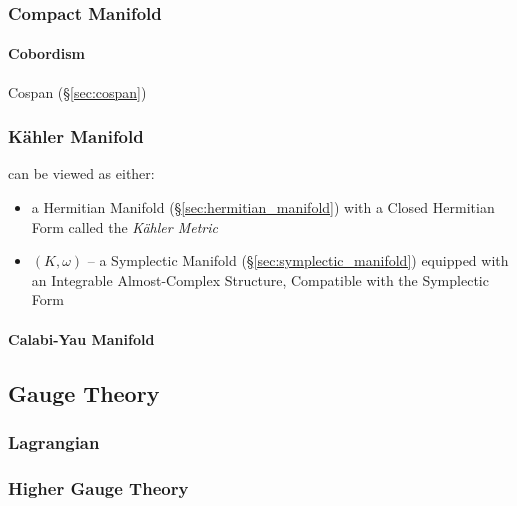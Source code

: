 \subsubsection{Compact Manifold}\label{sec:compact_manifold}

\paragraph{Cobordism}\label{sec:cobordism}\hfill

Cospan (\S\ref{sec:cospan})



\subsubsection{K\"ahler Manifold}\label{sec:kahler_manifold}

can be viewed as either:

\begin{itemize}
\item a Hermitian Manifold (\S\ref{sec:hermitian_manifold}) with a
  Closed Hermitian Form called the \emph{K\"ahler Metric} %
\item $(K,\omega)$ -- a Symplectic Manifold
  (\S\ref{sec:symplectic_manifold}) equipped with an Integrable
  Almost-Complex Structure, Compatible with the Symplectic Form %
\end{itemize}



\paragraph{Calabi-Yau Manifold}\label{sec:calabi_yau_manifold}



\subsection{Gauge Theory}\label{sec:gauge_theory}




\subsubsection{Lagrangian}\label{sec:lagrangian}

\subsubsection{Higher Gauge Theory}\label{sec:higher_gauge_theory}

